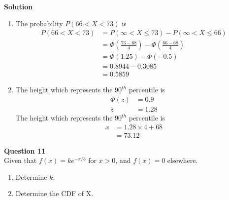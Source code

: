 \documentclass{uofa-eng-assignment}
\begin{document}
\begin{enumerate}
\begin{enumerate}
        \end{enumerate}
        \textbf{Solution}
        \begin{enumerate}
            \item The probability $P(66 < X < 73)$ is
                  \begin{align*}
                      P(66 < X < 73) & = P\left(\infty < X \leq 73\right) - P\left(\infty < X \leq 66\right)     \\
                                     & = \Phi\left(\frac{73 - 68}{4}\right) - \Phi\left(\frac{66 - 68}{4}\right) \\
                                     & = \Phi(1.25) - \Phi(-0.5)                                                 \\
                                     & = 0.8944 - 0.3085                                                         \\
                                     & = \boldsymbol{0.5859}
                  \end{align*}
            \item The height which represents the $90^{th}$ percentile is
                  \begin{align*}
                      \Phi(z) & = 0.9               \\
                      z       & = \boldsymbol{1.28}
                  \end{align*}
                  The height which represents the $90^{th}$ percentile is
                  \begin{align*}
                      x & = 1.28 \times 4 + 68 \\
                        & = \boldsymbol{73.12}
                  \end{align*}
        \end{enumerate}
        \textbf{Question 11} \\
        Given that $f(x) = ke^{-x/3}$ for $x > 0$, and $f(x) = 0$ elsewhere.
        \begin{enumerate}
            \item Determine $k$.
            \item Determine the CDF of X.

\end{enumerate}
\end{enumerate}
\end{document}
